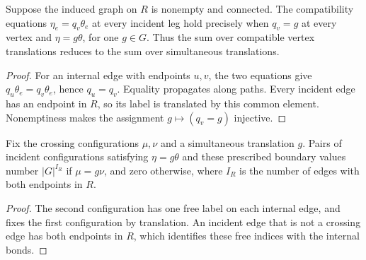 \begin{lemma}%
    \label{thm:peps_region_group_synchronization}
    \leanok
    Suppose the induced graph on $R$ is nonempty and connected.
    The compatibility equations
    $\eta_e=q_v\theta_e$ at every incident leg hold precisely when
    $q_v=g$ at every vertex and $\eta=g\theta$, for one $g\in G$.
    Thus the sum over compatible vertex translations reduces to
    the sum over simultaneous translations.
\end{lemma}
\begin{proof}\leanok
    For an internal edge with endpoints $u,v$, the two equations give
    $q_u\theta_e=q_v\theta_e$, hence $q_u=q_v$.
    Equality propagates along paths. Every incident edge has an
    endpoint in $R$, so its label is translated by this common element.
    Nonemptiness makes the assignment $g\mapsto(q_v=g)$ injective.
\end{proof}

\begin{lemma}%
    \label{thm:peps_region_internal_bond_count}
    \leanok
    Fix the crossing configurations $\mu,\nu$ and a simultaneous
    translation $g$. Pairs of incident configurations satisfying
    $\eta=g\theta$ and these prescribed boundary values number
    $|G|^{I_R}$ if $\mu=g\nu$, and zero otherwise, where $I_R$ is
    the number of edges with both endpoints in $R$.
\end{lemma}
\begin{proof}\leanok
    The second configuration has one free label on each internal
    edge, and fixes the first configuration by translation.
    An incident edge that is not a crossing edge has both endpoints
    in $R$, which identifies these free indices with the internal bonds.
\end{proof}


